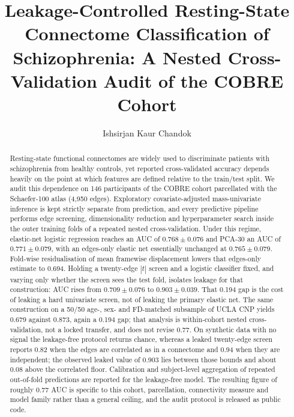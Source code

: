 \documentclass[runningheads]{llncs}
\begin{document}
\title{Leakage-Controlled Resting-State Connectome Classification of
Schizophrenia: A Nested Cross-Validation Audit of the COBRE Cohort}


\author{Ishsirjan Kaur Chandok}

\maketitle

\begin{abstract}
Resting-state functional connectomes are widely used to discriminate patients with
schizophrenia from healthy controls, yet reported cross-validated accuracy depends
heavily on the point at which features are defined relative to the train/test split.
We audit this dependence on 146 participants of the COBRE cohort parcellated with the
Schaefer-100 atlas (4,950 edges). Exploratory covariate-adjusted mass-univariate
inference is kept strictly separate from prediction, and every predictive pipeline
performs edge screening, dimensionality reduction and hyperparameter search inside the
outer training folds of a repeated nested cross-validation. Under this regime,
elastic-net logistic regression reaches an AUC of $0.768 \pm 0.076$ and PCA-30 an AUC of
$0.771 \pm 0.079$, with an edges-only elastic net essentially unchanged at
$0.765 \pm 0.079$. Fold-wise residualisation of mean framewise displacement lowers that
edges-only estimate to 0.694. Holding a twenty-edge $|t|$ screen and a logistic classifier
fixed, and varying only whether the screen sees the test fold, isolates leakage for that
construction: AUC rises from $0.709 \pm 0.076$ to $0.903 \pm 0.039$. That 0.194 gap is the
cost of leaking a hard univariate screen, not of leaking the primary elastic net. The
same construction on a 50/50 age-, sex- and FD-matched subsample of UCLA CNP yields
0.679 against 0.873, again a 0.194 gap; that analysis is within-cohort nested
cross-validation, not a locked transfer, and does not revise 0.77. On synthetic data with no
signal the leakage-free protocol returns chance, whereas a leaked twenty-edge screen
reports 0.82 when the edges are correlated as in a connectome and 0.94 when they are
independent; the observed leaked value of 0.903 lies between those bounds and about 0.08
above the correlated floor. Calibration and subject-level
aggregation of repeated out-of-fold predictions are reported for the leakage-free model.
The resulting figure of roughly 0.77 AUC is specific to this cohort, parcellation,
connectivity measure and model family rather than a general ceiling, and the audit
protocol is released as public code.

\end{abstract}
\end{document}
